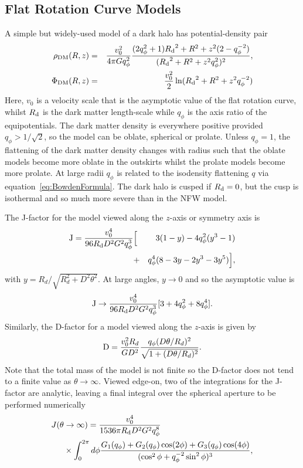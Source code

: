 \documentclass[prd,twocolumn,showpacs,preprintnumbers,superscriptaddress,nofootinbib,amsmath,amssymb,nobalancelastpage]{revtex4}
\def\rhoDM{{\rho_{\rm DM}}}
\def\Rd{{R_{\rm d}}}
\def\rhoDM{{\rho_{\rm DM}}}
\newcommand{\Df}{{\rm D}}
\newcommand{\Jf}{{\rm J}}
\begin{document}
\subsection{Flat Rotation Curve Models}\label{CoredModels}

A simple but widely-used model of a dark halo has potential-density pair \citep{BT,Ev93}
%
\begin{eqnarray}
\rhoDM(R,z) &=& {v_0^2 \over 4 \pi G q_\phi^2}{ (2q_\phi^2 +1)\Rd^2 +
  R^2 + z^2(2-q_\phi^{-2}) \over (\Rd^2 + R^2 + z^2 q_\phi^2)^2},\nonumber\\
\Phi_\mathrm{DM}(R,z) &=& {v_0^2 \over 2} \ln (\Rd^2 + R^2 + z^2 q_\phi^{-2})
\end{eqnarray}
%
Here, $v_0$ is a velocity scale that is the asymptotic value of the
flat rotation curve, whilst $\Rd$ is the dark matter length-scale
while $q_\phi$ is the axis ratio of the equipotentials.  The dark
matter density is everywhere positive provided $q_\phi > 1/\sqrt{2}$,
so the model can be oblate, spherical or prolate. Unless $q_\phi=1$, the flattening of the dark matter density changes with radius such that the oblate models become more oblate in the outskirts whilst the prolate models become more prolate. At large radii $q_\phi$ is related to the isodensity flattening $q$ via equation~\eqref{eq:BowdenFormula}. The dark halo is
cusped if $\Rd=0$, but the cusp is isothermal and so much more severe
than in the NFW model.

The J-factor for the model viewed along the $z$-axis or symmetry axis is
%
\begin{eqnarray}
\Jf = {v_0^4\over 96 \Rd D^2 G^2 q_\phi^3}&\Bigl[& 3(1-y)
  -4q_\phi^2(y^3-1)\nonumber \\ &+&
q_\phi^4(8-3y-2y^3-3y^5)\Bigr],
\end{eqnarray}
%
with $y = R_d/\sqrt{R_d^2+D^2\theta^2}$. At large angles,
$y\rightarrow 0$ and so the asymptotic value is
%
\begin{equation}
\Jf \rightarrow  {v_0^4\over 96 \Rd D^2 G^2 q_\phi^3}[ 3
  +4q_\phi^2 +
8q_\phi^4].
\end{equation}
Similarly, the D-factor for a model viewed along the $z$-axis is given by
\begin{equation}
\Df = \frac{v_0^2 R_d}{GD^2}\frac{ q_\phi(D\theta/R_d)^2}{\sqrt{1+(D\theta/R_d)^2}}.
\end{equation}
Note that the total mass of the model is not finite so the D-factor does not tend to a finite value as $\theta\rightarrow\infty$.
Viewed edge-on, two of the integrations for the J-factor are
analytic, leaving a final integral over the spherical aperture to be
performed numerically
%
\begin{equation}
\begin{split}
J(\theta&\rightarrow\infty) = {v_0^4 \over 1536 \pi \Rd D^2 G^2 q_\phi^8} \\&\times\int_0^{2\pi}d\phi{
  G_1(q_\phi)+G_2(q_\phi)\cos(2\phi)+G_3(q_\phi)\cos(4\phi)
\over
  (\cos^2\phi + q_\phi^{-2} \sin^2\phi)^3},
\end{split}
\end{equation}
\end{document}
